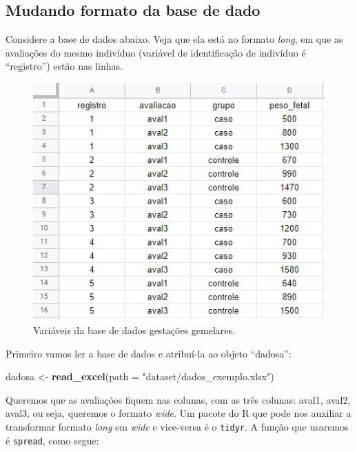 \documentclass[
]{book}
\newenvironment{Shaded}{\begin{snugshade}}{\end{snugshade}}
\newcommand{\DataTypeTok}[1]{\textcolor[rgb]{0.13,0.29,0.53}{#1}}
\newcommand{\KeywordTok}[1]{\textcolor[rgb]{0.13,0.29,0.53}{\textbf{#1}}}
\newcommand{\NormalTok}[1]{#1}
\newcommand{\StringTok}[1]{\textcolor[rgb]{0.31,0.60,0.02}{#1}}
\begin{document}
\hypertarget{formato}{%
\subsection{Mudando formato da base de dado}\label{formato}}

Considere a base de dados abaixo. Veja que ela está no formato \emph{long}, em que as avaliações do mesmo indivíduo (variável de identificação de indivíduo é ``registro'') estão nas linhas.

\begin{figure}
\includegraphics[width=1\linewidth]{figures/dados_exemplo} \caption{Variáveis da base de dados gestações gemelares.}\label{fig:unnamed-chunk-125}
\end{figure}

Primeiro vamos ler a base de dados e atribuí-la ao objeto ``dadosa'':

\begin{Shaded}
\begin{Highlighting}[]
\NormalTok{dadosa <-}\StringTok{ }\KeywordTok{read_excel}\NormalTok{(}\DataTypeTok{path =} \StringTok{"dataset/dados_exemplo.xlsx"}\NormalTok{)}
\end{Highlighting}
\end{Shaded}

Queremos que as avaliações fiquem nas colunas, com as três colunas: aval1, aval2, aval3, ou seja, queremos o formato \emph{wide}. Um pacote do R que pode nos auxiliar a transformar formato \emph{long} em \emph{wide} e vice-versa é o \texttt{tidyr}. A função que usaremos é \texttt{spread}, como segue:
\end{document}
